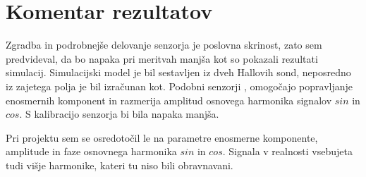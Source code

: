 \section{Komentar rezultatov}
Zgradba in podrobnejše delovanje senzorja je poslovna skrinost, zato sem predvideval, da bo napaka pri meritvah manjša kot so pokazali rezultati simulacij. Simulacijski model je bil sestavljen iz dveh Hallovih sond, neposredno iz zajetega polja je bil izračunan kot. 
Podobni senzorji \cite{iCMHM}, omogočajo popravljanje enosmernih komponent in razmerija amplitud osnovega harmonika signalov $sin$ in $cos$. S kalibracijo senzorja bi bila napaka manjša.

Pri projektu sem se osredotočil le na parametre enosmerne komponente, amplitude in faze osnovnega harmonika $sin$ in $cos$. Signala v realnosti vsebujeta tudi višje harmonike, kateri tu niso bili obravnavani.



